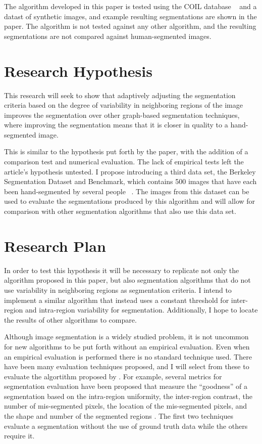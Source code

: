 The algorithm developed in this paper is tested using the COIL database
~\cite{nene1996columbia} and a datast of synthetic images, and example resulting
segmentations are shown in the paper.  The algorithm is not tested against any
other algorithm, and the resulting segmentations are not compared against
human-segmented images.


\section{Research Hypothesis}
This research will seek to show that adaptively adjusting the segmentation criteria
based on the degree of variability in neighboring regions of the image improves
the segmentation over other graph-based segmentation techniques, where improving
the segmentation means that it is closer in quality to a hand-segmented image.

This is similar to the hypothesis put forth by the paper, with the addition of a
comparison test and numerical evaluation.  The lack of empirical tests left the
article's hypothesis untested.  I propose introducing a third data set,
the Berkeley Segmentation Dataset and Benchmark, which contains 500 images that
have each been hand-segmented by several people ~\cite{MartinFTM01}.  The images
from this dataset can be used to evaluate the segmentations produced by this
algorithm and will allow for comparison with other segmentation algorithms that
also use this data set.

\section{Research Plan}
In order to test this hypothesis it will be necessary to replicate not only the
algorithm proposed in this paper, but also segmentation algorithms that do not
use variability in neighboring regions as segmentation criteria.  I intend to
implement a similar algorithm that instead uses a constant threshold for inter-
region and intra-region variability for segmentation.  Additionally, I hope to
locate the results of other algorithms to compare.

Although image segmentation is a widely studied problem, it is not uncommon for
new algorithms to be put forth without an empirical evaluation.  Even when an
empirical evaluation is performed there is no standard technique used.  There
have been many evaluation techniques proposed, and I will select from these to
evaluate the algortithm proposed by \cite{felzenszwalb2004}.  For example,
several metrics for segmentation evaluation have been proposed that measure the
``goodness'' of a segmentation based on the intra-region uniformity, the
inter-region contrast, the number of mis-segmented pixels, the location of the
mis-segmented pixels, and the shape and number of the segmented regions
\cite{zhang1996survey}.  The first two techniques evaluate a segmentation without the
use of ground truth data while the others require it.

